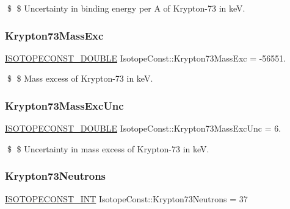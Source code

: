 \$ \$ Uncertainty in binding energy per A of Krypton-\/73 in keV. \mbox{\label{group___isotope_const-_krypton-_kr73_gadf7b6d43e76cb4b4fc0c70bc47bf0ac9}} 
\subsubsection{\texorpdfstring{Krypton73\+Mass\+Exc}{Krypton73MassExc}}
{\footnotesize\ttfamily \mbox{\hyperlink{group___isotope_const-_macros_ga8f45a7272ce02c0b4c65c44636ed719a}{I\+S\+O\+T\+O\+P\+E\+C\+O\+N\+S\+T\+\_\+\+D\+O\+U\+B\+LE}} Isotope\+Const\+::\+Krypton73\+Mass\+Exc = -\/56551.}

\$ \$ Mass excess of Krypton-\/73 in keV. \mbox{\label{group___isotope_const-_krypton-_kr73_ga2531b1dcdcf1b0fe9c0c6c3131cea79e}} 
\subsubsection{\texorpdfstring{Krypton73\+Mass\+Exc\+Unc}{Krypton73MassExcUnc}}
{\footnotesize\ttfamily \mbox{\hyperlink{group___isotope_const-_macros_ga8f45a7272ce02c0b4c65c44636ed719a}{I\+S\+O\+T\+O\+P\+E\+C\+O\+N\+S\+T\+\_\+\+D\+O\+U\+B\+LE}} Isotope\+Const\+::\+Krypton73\+Mass\+Exc\+Unc = 6.}

\$ \$ Uncertainty in mass excess of Krypton-\/73 in keV. \mbox{\label{group___isotope_const-_krypton-_kr73_ga6b14f6201e6fb1e7e554943918decb96}} 
\subsubsection{\texorpdfstring{Krypton73\+Neutrons}{Krypton73Neutrons}}
{\footnotesize\ttfamily \mbox{\hyperlink{group___isotope_const-_macros_ga5f18360b3e99483a35c32d789e62621c}{I\+S\+O\+T\+O\+P\+E\+C\+O\+N\+S\+T\+\_\+\+I\+NT}} Isotope\+Const\+::\+Krypton73\+Neutrons = 37}


